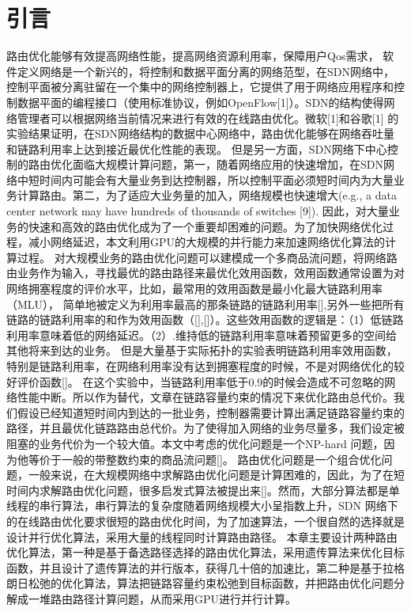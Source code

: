 
\section{引言}
路由优化能够有效提高网络性能，提高网络资源利用率，保障用户Qos需求，
软件定义网络是一个新兴的，将控制和数据平面分离的网络范型，在SDN网络中，控制平面被分离驻留在一个集中的网络控制器上，它提供了用于网络应用程序和控制数据平面的编程接口（使用标准协议，例如OpenFlow[1]）。SDN的结构使得网络管理者可以根据网络当前情况来进行有效的在线路由优化。微软[1]和谷歌[1] 的实验结果证明，在SDN网络结构的数据中心网络中，路由优化能够在网络吞吐量和链路利用率上达到接近最优化性能的表现。
但是另一方面，SDN网络下中心控制的路由优化面临大规模计算问题，第一，随着网络应用的快速增加，在SDN网络中短时间内可能会有大量业务到达控制器，所以控制平面必须短时间内为大量业务计算路由。第二，为了适应大业务量的加入，网络规模也快速增大(e.g., a data center network may have hundreds of thousands of switches [9]). 因此，对大量业务的快速和高效的路由优化成为了一个重要却困难的问题。为了加快网络优化过程，减小网络延迟，本文利用GPU的大规模的并行能力来加速网络优化算法的计算过程。
对大规模业务的路由优化问题可以建模成一个多商品流问题，将网络路由业务作为输入，寻找最优的路由路径来最优化效用函数，效用函数通常设置为对网络拥塞程度的评价水平，比如，最常用的效用函数是最小化最大链路利用率（MLU），
简单地被定义为利用率最高的那条链路的链路利用率[],另外一些把所有链路的链路利用率的和作为效用函数（[],[]）。这些效用函数的逻辑是：（1）低链路利用率意味着低的网络延迟。（2）.维持低的链路利用率意味着预留更多的空间给其他将来到达的业务。
但是大量基于实际拓扑的实验表明链路利用率效用函数，特别是链路利用率，在网络利用率没有达到拥塞程度的时候，不是对网络优化的较好评价函数[]。
在这个实验中，当链路利用率低于0.9的时候会造成不可忽略的网络性能中断。所以作为替代，文章在链路容量约束的情况下来优化路由总代价。我们假设已经知道短时间内到达的一批业务，控制器需要计算出满足链路容量约束的路径，并且最优化链路路由总代价。为了使得加入网络的业务尽量多，我们设定被阻塞的业务代价为一个较大值。本文中考虑的优化问题是一个NP-hard 问题，因为他等价于一般的带整数约束的商品流问题[]。
路由优化问题是一个组合优化问题，一般来说，在大规模网络中求解路由优化问题是计算困难的，因此，为了在短时间内求解路由优化问题，很多启发式算法被提出来[]。然而，大部分算法都是单线程的串行算法，串行算法的复杂度随着网络规模大小呈指数上升，SDN 网络下的在线路由优化要求很短的路由优化时间，为了加速算法，一个很自然的选择就是设计并行优化算法，采用大量的线程同时计算路由路径。
本章主要设计两种路由优化算法，第一种是基于备选路径选择的路由优化算法，采用遗传算法来优化目标函数，并且设计了遗传算法的并行版本，获得几十倍的加速比，第二种是基于拉格朗日松弛的优化算法，算法把链路容量约束松弛到目标函数，并把路由优化问题分解成一堆路由路径计算问题，从而采用GPU进行并行计算。
